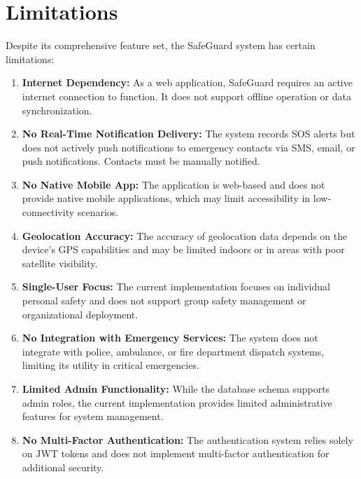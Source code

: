 \section{Limitations}

Despite its comprehensive feature set, the SafeGuard system has certain limitations:

\begin{enumerate}[label=\arabic*.]
  \item \textbf{Internet Dependency:} As a web application, SafeGuard requires an active internet connection to function. It does not support offline operation or data synchronization.

  \item \textbf{No Real-Time Notification Delivery:} The system records SOS alerts but does not actively push notifications to emergency contacts via SMS, email, or push notifications. Contacts must be manually notified.

  \item \textbf{No Native Mobile App:} The application is web-based and does not provide native mobile applications, which may limit accessibility in low-connectivity scenarios.

  \item \textbf{Geolocation Accuracy:} The accuracy of geolocation data depends on the device's GPS capabilities and may be limited indoors or in areas with poor satellite visibility.

  \item \textbf{Single-User Focus:} The current implementation focuses on individual personal safety and does not support group safety management or organizational deployment.

  \item \textbf{No Integration with Emergency Services:} The system does not integrate with police, ambulance, or fire department dispatch systems, limiting its utility in critical emergencies.

  \item \textbf{Limited Admin Functionality:} While the database schema supports admin roles, the current implementation provides limited administrative features for system management.

  \item \textbf{No Multi-Factor Authentication:} The authentication system relies solely on JWT tokens and does not implement multi-factor authentication for additional security.
\end{enumerate}
